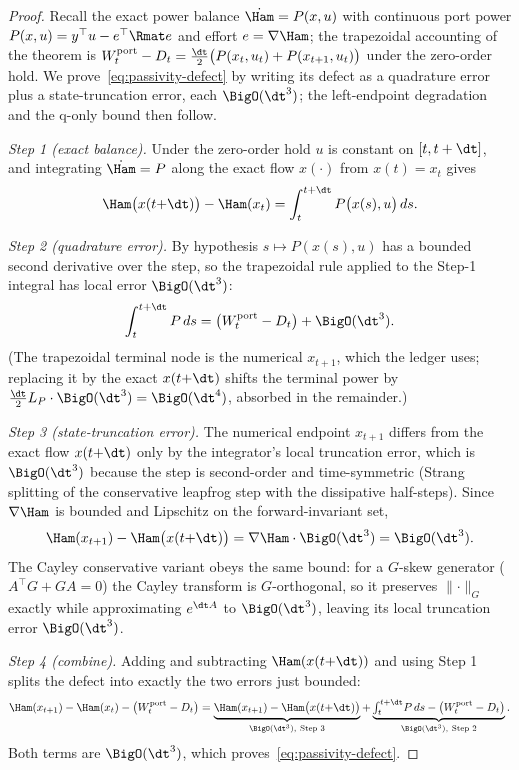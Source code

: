 \begin{proof}
Recall the exact power balance $\dot\Ham=P(x,u)$ with continuous port power $P(x,u)=y^\top u-e^\top\Rmat e$ and effort $e=\nabla\Ham$; the trapezoidal accounting of the theorem is $W^{\mathrm{port}}_t-D_t=\tfrac{\dt}{2}\bigl(P(x_t,u_t)+P(x_{t+1},u_t)\bigr)$ under the zero-order hold. We prove~\eqref{eq:passivity-defect} by writing its defect as a quadrature error plus a state-truncation error, each $\BigO(\dt^3)$; the left-endpoint degradation and the q-only bound then follow.

\emph{Step 1 (exact balance).} Under the zero-order hold $u$ is constant on $[t,t+\dt]$, and integrating $\dot\Ham=P$ along the exact flow $x(\cdot)$ from $x(t)=x_t$ gives
\[
  \Ham\bigl(x(t{+}\dt)\bigr)-\Ham(x_t)=\int_t^{t+\dt} P\bigl(x(s),u\bigr)\,ds .
\]

\emph{Step 2 (quadrature error).} By hypothesis $s\mapsto P(x(s),u)$ has a bounded second derivative over the step, so the trapezoidal rule applied to the Step-1 integral has local error $\BigO(\dt^3)$:
\[
  \int_t^{t+\dt} P\,ds=\bigl(W^{\mathrm{port}}_t-D_t\bigr)+\BigO(\dt^3) .
\]
(The trapezoidal terminal node is the numerical $x_{t+1}$, which the ledger uses; replacing it by the exact $x(t{+}\dt)$ shifts the terminal power by $\tfrac{\dt}{2}L_P\cdot\BigO(\dt^3)=\BigO(\dt^4)$, absorbed in the remainder.)

\emph{Step 3 (state-truncation error).} The numerical endpoint $x_{t+1}$ differs from the exact flow $x(t{+}\dt)$ only by the integrator's local truncation error, which is $\BigO(\dt^3)$ because the step is second-order and time-symmetric (Strang splitting of the conservative leapfrog step with the dissipative half-steps). Since $\nabla\Ham$ is bounded and Lipschitz on the forward-invariant set,
\[
  \Ham(x_{t+1})-\Ham\bigl(x(t{+}\dt)\bigr)=\nabla\Ham\cdot\BigO(\dt^3)=\BigO(\dt^3) .
\]
The Cayley conservative variant obeys the same bound: for a $G$-skew generator ($A^\top G+GA=0$) the Cayley transform is $G$-orthogonal, so it preserves $\lVert\cdot\rVert_G$ exactly while approximating $e^{\dt A}$ to $\BigO(\dt^3)$, leaving its local truncation error $\BigO(\dt^3)$.

\emph{Step 4 (combine).} Adding and subtracting $\Ham(x(t{+}\dt))$ and using Step 1 splits the defect into exactly the two errors just bounded:
\[
  \Ham(x_{t+1})-\Ham(x_t)-\bigl(W^{\mathrm{port}}_t-D_t\bigr)
  =\underbrace{\Ham(x_{t+1})-\Ham\bigl(x(t{+}\dt)\bigr)}_{\BigO(\dt^3),\ \text{Step 3}}
  +\underbrace{\textstyle\int_t^{t+\dt}\! P\,ds-\bigl(W^{\mathrm{port}}_t-D_t\bigr)}_{\BigO(\dt^3),\ \text{Step 2}} .
\]
Both terms are $\BigO(\dt^3)$, which proves~\eqref{eq:passivity-defect}.


\end{proof}
